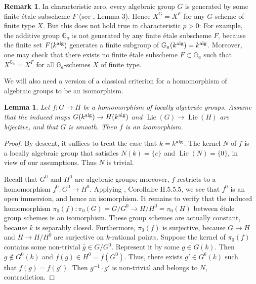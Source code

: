 \documentclass[oneside, 12pt]{amsart}
\newtheorem{lemma}[theorem]{Lemma}
\theoremstyle{definition}
\newtheorem{remark}[theorem]{Remark}
\theoremstyle{remark}
\newcommand{\GG}{\mathbb{G}}
\newcommand{\alg}{\text{\rm alg}}
\newcommand{\Lie}{\operatorname{Lie}}
\newcommand{\ra}{\rightarrow}
\begin{document}
\begin{remark}
\label{rem:fixed}
In characteristic zero, every algebraic group $G$ is generated 
by some finite \'etale subscheme $F$ (see \cite{Brion 2014}, 
Lemma 3). Hence $X^G = X^F$ for any $G$-scheme of finite type $X$. 
But this does not hold true in characteristic $p > 0$: 
For example, the additive group $\GG_a$ is not 
generated by any finite \'etale subscheme $F$, because  
the finite set $F(k^{\alg})$ generates a finite subgroup 
of $\GG_a(k^{\alg}) = k^{\alg}$. Moreover, one may check
that there exists no finite \'etale subscheme $F\subset \GG_a$ 
such that $X^{\GG_a} = X^F$ for all $\GG_a$-schemes $X$ 
of finite type.
\end{remark}

We will also need a version of a classical criterion
for a homomorphism of algebraic groups to be an 
isomorphism.

\begin{lemma}
\label{lem:hom}
Let  $f:G\ra H$ be a homomorphism of locally algebraic groups.
Assume that the induced maps
$ G(k^{\alg}) \to H(k^{\alg})$
and $ \Lie(G) \to \Lie(H)$ 
are bijective, and that $G$ is smooth. Then $f$ is an isomorphism.
\end{lemma}

\begin{proof}
By descent, it suffices to treat the case that  $k=k^\alg$.
The kernel $N$ of $f$ is a locally algebraic group that satisfies 
$N(k) = \{ e \}$ and $\Lie(N) = \{ 0 \}$,
in view of our assumptions. Thus $N$ is trivial.

Recall that $G^0$ and $H^0$ are algebraic groups; moreover,
$f$ restricts to a homomorphism $f^0 : G^0 \to H^0$. 
Applying \cite{Demazure;  Gabriel 1970},
Corollaire II.5.5.5, we see that $f^0$ is an open immersion,
and hence an isomorphism.
It remains to verify that the induced homomorphism 
$\pi_0(f) : \pi_0(G) = G/G^0\ra H/H^0 = \pi_0(H)$
between \'etale  group schemes is an isomorphism. 
These group schemes are actually constant, because $k$
is separably closed. Furthermore, $\pi_0(f)$ is surjective, 
because $G\ra H$ and $H\ra H/H^0$
are surjective on $k$-rational points.
Suppose the kernel of $\pi_0(f)$
contains some  non-trivial $\bar{g}\in G/G^0$.
Represent it by some $g\in G(k)$. Then $g\not\in G^0(k)$ and 
$f(g)\in H^0 = f(G^0)$. Thus, there exists $g' \in G^0(k)$
such that $f(g) = f(g')$. Then $g^{-1}\cdot g'$ is 
non-trivial and belongs to $N$, contradiction.
\end{proof}
\end{document}
